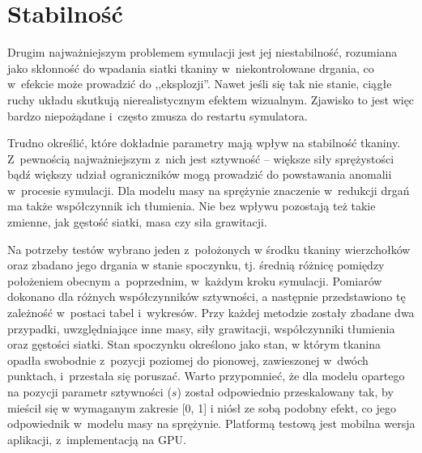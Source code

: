 		
		
		
		
		
		
	
	\section{Stabilność}
	\label{t:wyniki:stabilnosc}
	
		Drugim najważniejszym problemem symulacji jest jej niestabilność, rozumiana jako skłonność do wpadania siatki tkaniny w~niekontrolowane drgania, co w~efekcie może prowadzić do ,,eksplozji''. Nawet jeśli się tak nie stanie, ciągłe ruchy układu skutkują nierealistycznym efektem wizualnym. Zjawisko to jest więc bardzo niepożądane i~często zmusza do restartu symulatora.
		
		Trudno określić, które dokładnie parametry mają wpływ na stabilność tkaniny. Z~pewnością najważniejszym z~nich jest sztywność -- większe siły sprężystości bądź większy udział ograniczników mogą prowadzić do powstawania anomalii w~procesie symulacji. Dla modelu masy na sprężynie znaczenie w~redukcji drgań ma także współczynnik ich tłumienia. Nie bez wpływu pozostają też takie zmienne, jak gęstość siatki, masa czy siła grawitacji.
		
		Na potrzeby testów wybrano jeden z~położonych w środku tkaniny wierzchołków oraz zbadano jego drgania w stanie spoczynku, tj. średnią różnicę pomiędzy położeniem obecnym a~poprzednim, w~każdym kroku symulacji. Pomiarów dokonano dla różnych współczynników sztywności, a następnie przedstawiono tę zależność w~postaci tabel i~wykresów. Przy każdej metodzie zostały zbadane dwa przypadki, uwzględniające inne masy, siły grawitacji, współczynniki tłumienia oraz gęstości siatki. Stan spoczynku określono jako stan, w którym tkanina opadła swobodnie z~pozycji poziomej do pionowej, zawieszonej w~dwóch punktach, i~przestała się poruszać. Warto przypomnieć, że dla modelu opartego na pozycji parametr sztywności (\(s\)) został odpowiednio przeskalowany tak, by mieścił się w wymaganym zakresie [0, 1] i niósł ze sobą podobny efekt, co jego odpowiednik w~modelu masy na sprężynie. Platformą testową jest mobilna wersja aplikacji, z~implementacją na GPU.
		
